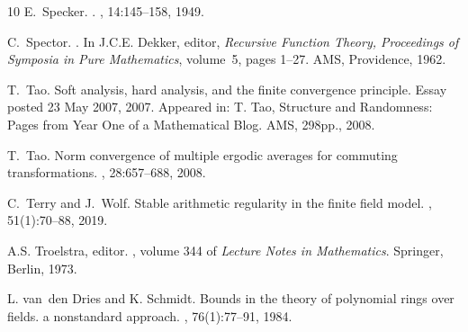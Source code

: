 \documentclass[11pt]{amsart}
\theoremstyle{definition}
\theoremstyle{remark}
\begin{document}
\begin{thebibliography}{10}
E.~Specker.
.
, 14:145--158, 1949.

C.~Spector.
.
\newblock In J.C.E. Dekker, editor, {\em {Recursive Function Theory,
  Proceedings of Symposia in Pure Mathematics}}, volume~5, pages 1--27. AMS,
  Providence, 1962.

T.~Tao.
\newblock Soft analysis, hard analysis, and the finite convergence principle.
\newblock Essay posted 23 May 2007, 2007.
\newblock Appeared in: T. Tao, Structure and Randomness: Pages from Year One
  of a Mathematical Blog. AMS, 298pp., 2008.

T.~Tao.
\newblock Norm convergence of multiple ergodic averages for commuting
  transformations.
, 28:657--688, 2008.

C.~Terry and J.~Wolf.
\newblock Stable arithmetic regularity in the finite field model.
, 51(1):70--88,
  2019.

A.S. Troelstra, editor.
, volume 344 of {\em Lecture Notes in Mathematics}.
\newblock Springer, Berlin, 1973.

L. van~den Dries and K. Schmidt.
\newblock Bounds in the theory of polynomial rings over fields. a nonstandard
  approach.
, 76(1):77--91, 1984.


\end{thebibliography}
\end{document}
